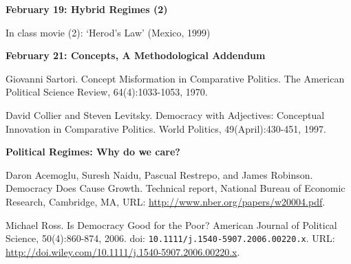 \documentclass[letterpaper]{article}
\renewenvironment{itemize}{
  \begin{list}{}{
    \setlength{\leftmargin}{1.5em}
  }
}{
  \end{list}
}
\begin{document}
\begin{enumerate}
\begin{itemize}
		\item {\bf February 19: Hybrid Regimes (2)}
			\begin{itemize}
				\item[$\bullet$] In class movie (2): `Herod's Law' (Mexico, 1999)
			\end{itemize}



		\item {\bf February 21: Concepts, A Methodological Addendum}
			\begin{itemize}
				\item[$\bullet$] Giovanni Sartori. Concept Misformation in Comparative Politics. The American Political Science Review, 64(4):1033-1053, 1970.
				\item[$\bullet$] David Collier and Steven Levitsky. Democracy with Adjectives: Conceptual Innovation in Comparative Politics. World Politics, 49(April):430-451, 1997.
			\end{itemize}
		
	
	\end{itemize}



\item {\bf Political Regimes: Why do we care?}
	\begin{itemize}
		\item[$\bullet$] Daron Acemoglu, Suresh Naidu, Pascual Restrepo, and James Robinson. Democracy Does Cause Growth. Technical report, National Bureau of Economic Research, Cambridge, MA, URL: \url{http://www.nber.org/papers/w20004.pdf}.
		\item[$\bullet$] Michael Ross. Is Democracy Good for the Poor? American Journal of Political Science, 50(4):860-874,  2006. doi: \texttt{10.1111/j.1540-5907.2006.00220.x}. URL: \url{http://doi.wiley.com/10.1111/j.1540-5907.2006.00220.x}.
	\end{itemize}



\end{enumerate}
\end{document}
